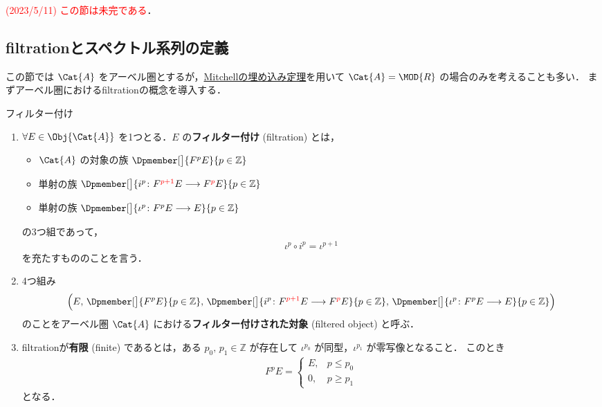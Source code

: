 \documentclass[algtopo_main]{subfiles}
\begin{document}
\textcolor{red}{(2023/5/11) この節は未完である}．

\subsection{filtrationとスペクトル系列の定義}

この節では $\Cat{A}$ をアーベル圏とするが，\hyperref[thm:embedding]{Mitchellの埋め込み定理}を用いて $\Cat{A} = \MOD{R}$ の場合のみを考えることも多い．
まずアーベル圏におけるfiltrationの概念を導入する．

\begin{mydef}[label=def:filtration, breakable]{フィルター付け}
    \begin{enumerate}
        \item $\forall E \in \Obj{\Cat{A}}$ を1つとる．$E$ の\textbf{フィルター付け} (filtration) とは，
        \begin{itemize}
            \item $\Cat{A}$ の対象の族 $\Dpmember[\big]{F^pE}{p \in \mathbb{Z}}$
            \item 単射の族 $\Dpmember[\big]{i^p \colon F^{\textcolor{red}{p+1}}E \lto F^{\textcolor{red}{p}}E}{p \in \mathbb{Z}}$
            \item 単射の族 $\Dpmember[\big]{\iota^p \colon F^{p}E \lto E}{p \in \mathbb{Z}}$
        \end{itemize}
        の3つ組であって，
        \begin{align}
            \iota^p \circ i^{p} = \iota^{p+1}
        \end{align}
        を充たすもののことを言う．
        \item 4つ組み
        \begin{align}
            \Bigl( E,\, \Dpmember[\big]{F^pE}{p \in \mathbb{Z}},\, \Dpmember[\big]{i^p \colon F^{\textcolor{red}{p+1}}E \lto F^{\textcolor{red}{p}}E}{p \in \mathbb{Z}},\, \Dpmember[\big]{\iota^p \colon F^{p}E \lto E}{p \in \mathbb{Z}} \Bigr)
        \end{align}
        のことをアーベル圏 $\Cat{A}$ における\textbf{フィルター付けされた対象} (filtered object) と呼ぶ．
        \item filtrationが\textbf{有限} (finite) であるとは，ある $p_0,\, p_1 \in \mathbb{Z}$ が存在して
        $\iota^{p_0}$ が同型，$\iota^{p_1}$ が零写像となること．
        このとき
        \begin{align}
            F^pE =
            \begin{cases}
                E, &p \le p_0 \\
                0, &p \ge p_1
            \end{cases}
        \end{align}
        となる．
    \end{enumerate}
\end{mydef}
\end{document}
